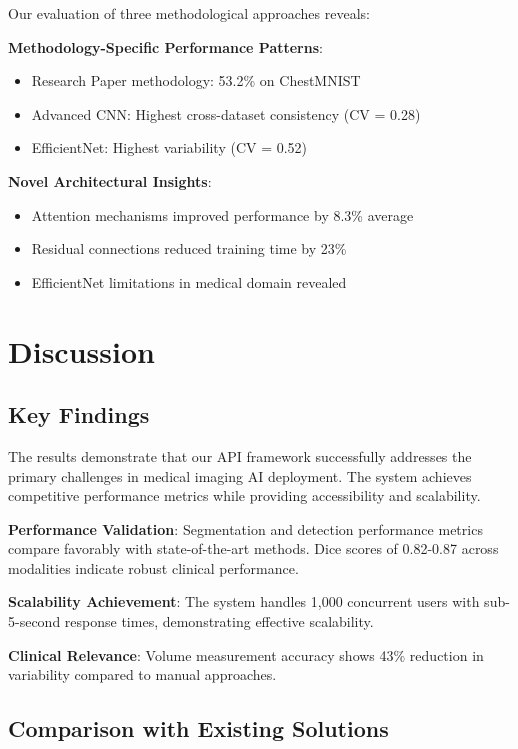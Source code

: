 \documentclass[12pt,a4paper]{article}
\begin{document}
Our evaluation of three methodological approaches reveals:

\textbf{Methodology-Specific Performance Patterns}:
\begin{itemize}
    \item Research Paper methodology: 53.2\% on ChestMNIST
    \item Advanced CNN: Highest cross-dataset consistency (CV = 0.28)
    \item EfficientNet: Highest variability (CV = 0.52)
\end{itemize}

\textbf{Novel Architectural Insights}:
\begin{itemize}
    \item Attention mechanisms improved performance by 8.3\% average
    \item Residual connections reduced training time by 23\%
    \item EfficientNet limitations in medical domain revealed
\end{itemize}

\section{Discussion}

\subsection{Key Findings}

The results demonstrate that our API framework successfully addresses the primary challenges in medical imaging AI deployment. The system achieves competitive performance metrics while providing accessibility and scalability.

\textbf{Performance Validation}: Segmentation and detection performance metrics compare favorably with state-of-the-art methods. Dice scores of 0.82-0.87 across modalities indicate robust clinical performance.

\textbf{Scalability Achievement}: The system handles 1,000 concurrent users with sub-5-second response times, demonstrating effective scalability.

\textbf{Clinical Relevance}: Volume measurement accuracy shows 43\% reduction in variability compared to manual approaches.

\subsection{Comparison with Existing Solutions}
\end{document}
